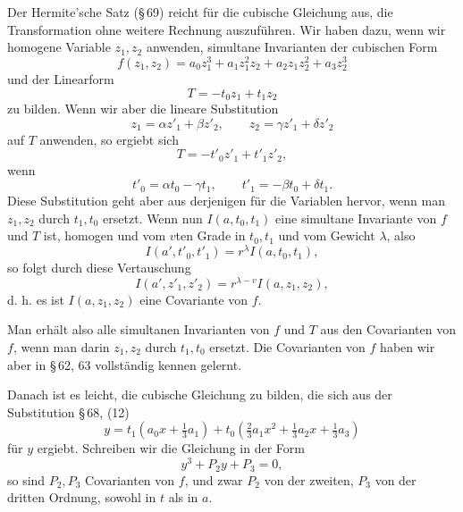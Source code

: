 \documentclass[11pt]{article}
\begin{document}
Der Hermite'sche Satz (\S\,69) reicht für die cubische Gleichung aus, die Transformation ohne weitere Rechnung auszuführen. Wir haben dazu, wenn wir homogene Variable $z_1,z_2$ anwenden, simultane Invarianten der cubischen Form
\begin{equation}
 f(z_1,z_2)=a_0z_1^3+a_1z_1^2z_2+a_2z_1z_2^2+a_3z_2^3
\tag{1}
\end{equation}
und der Linearform
\begin{equation}
 T=-t_0z_1+t_1z_2
\tag{2}
\end{equation}
zu bilden. Wenn wir aber die lineare Substitution
\[
 z_1=\alpha z'_1+\beta z'_2,
 \qquad
 z_2=\gamma z'_1+\delta z'_2
\]
auf $T$ anwenden, so ergiebt sich
\[
 T=-t'_0z'_1+t'_1z'_2,
\]
wenn
\begin{equation}
 t'_0=\alpha t_0-\gamma t_1,
 \qquad
 t'_1=-\beta t_0+\delta t_1.
\tag{3}
\end{equation}
Diese Substitution geht aber aus derjenigen für die Variablen hervor, wenn man $z_1,z_2$ durch $t_1,t_0$ ersetzt. Wenn nun $I(a,t_0,t_1)$ eine simultane Invariante von $f$ und $T$ ist, homogen und vom $v$ten Grade in $t_0,t_1$ und vom Gewicht $\lambda$, also
\begin{equation}
 I(a',t'_0,t'_1)=r^\lambda I(a,t_0,t_1),
\tag{4}
\end{equation}
so folgt durch diese Vertauschung
\[
 I(a',z'_1,z'_2)=r^{\lambda-v}I(a,z_1,z_2),
\]
d. h. es ist $I(a,z_1,z_2)$ eine Covariante von $f$.

Man erhält also alle simultanen Invarianten von $f$ und $T$ aus den Covarianten von $f$, wenn man darin $z_1,z_2$ durch $t_1,t_0$ ersetzt. Die Covarianten von $f$ haben wir aber in \S\,62, 63 vollständig kennen gelernt.

Danach ist es leicht, die cubische Gleichung zu bilden, die sich aus der Substitution \S\,68, (12)
\begin{equation}
 y=t_1(a_0x+\tfrac13a_1)+t_0\left(\tfrac23a_1x^2+\tfrac13a_2x+\tfrac13a_3\right)
\tag{5}
\end{equation}
für $y$ ergiebt. Schreiben wir die Gleichung in der Form
\[
 y^3+P_2y+P_3=0,
\]
so sind $P_2,P_3$ Covarianten von $f$, und zwar $P_2$ von der zweiten, $P_3$ von der dritten Ordnung, sowohl in $t$ als in $a$.
\end{document}
